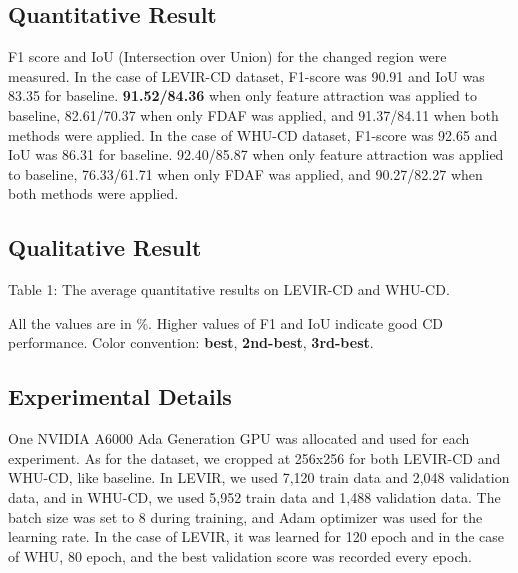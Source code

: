 \documentclass[../main.tex]{subfiles}
\begin{document}
\subsection{Quantitative Result}
F1 score and IoU (Intersection over Union) for the changed region were measured. In the case of LEVIR-CD dataset, F1-score was 90.91 and IoU was 83.35 for baseline. \textbf{91.52/84.36} when only feature attraction was applied to baseline, 82.61/70.37 when only FDAF was applied, and 91.37/84.11 when both methods were applied. In the case of WHU-CD dataset, F1-score was 92.65 and IoU was 86.31 for baseline.  92.40/85.87 when only feature attraction was applied to baseline, 76.33/61.71 when only FDAF was applied, and 90.27/82.27 when both methods were applied.
\subsection{Qualitative Result}
Table 1: The average quantitative results on LEVIR-CD and WHU-CD.

\∗All the values are in \%. Higher values of F1 and IoU indicate good CD performance. Color convention:
{\color[HTML]{FE0000} \textbf{best}}, {\color[HTML]{3531FF} \textbf{2nd-best}}, \textbf{3rd-best}.
\subsection{Experimental Details}
One NVIDIA A6000 Ada Generation GPU was allocated and used for each experiment. As for the dataset, we cropped at 256x256 for both LEVIR-CD and WHU-CD, like baseline. In LEVIR, we used 7,120 train data and 2,048 validation data, and in WHU-CD, we used 5,952 train data and 1,488 validation data. The batch size was set to 8 during training, and Adam optimizer was used for the learning rate. In the case of LEVIR, it was learned for 120 epoch and in the case of WHU, 80 epoch, and the best validation score was recorded every epoch. 
\end{document}
